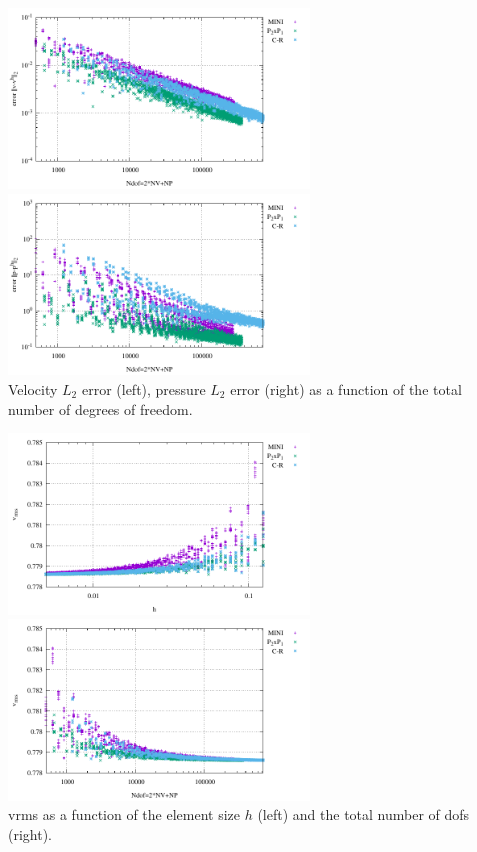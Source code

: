 \begin{center}
\includegraphics[width=8cm]{python_codes/fieldstone_112/results/exp5_tridiag/errors_V_ndof.pdf}
\includegraphics[width=8cm]{python_codes/fieldstone_112/results/exp5_tridiag/errors_P_ndof.pdf}\\
{\captionfont Velocity $L_2$ error (left), pressure $L_2$ error (right) as a function of the total 
number of degrees of freedom.} 
\end{center}


\begin{center}
\includegraphics[width=8cm]{python_codes/fieldstone_112/results/exp5_tridiag/vrms.pdf}
\includegraphics[width=8cm]{python_codes/fieldstone_112/results/exp5_tridiag/vrms_ndof.pdf}\\
{\captionfont vrms as a function of the element size $h$ (left) and the total number of dofs (right).}
\end{center}


